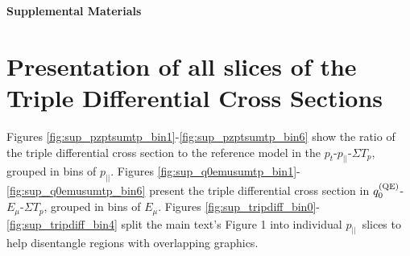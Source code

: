 \documentclass[aps,preprint,showpacs,superscriptaddress]{revtex4-2}  %
\newcommand{\pt}{\ensuremath{p_{t}}}
\newcommand{\pz}{\ensuremath{p_{||}}}
\newcommand{\sumtp}{\ensuremath{\Sigma T_{p}}}
\newcommand{\qzeroqe}{\ensuremath{q_{0}^{\rm\scriptstyle (QE)}}}
\begin{document}
\begin{center}
\textbf{\large Supplemental Materials}
\end{center}



\section{Presentation of all slices of the Triple Differential Cross Sections}
Figures \ref{fig:sup_pzptsumtp_bin1}-\ref{fig:sup_pzptsumtp_bin6} show the ratio of the triple differential cross section to the reference model in the \pt-\pz-\sumtp, grouped in bins of $\pz$.
Figures \ref{fig:sup_q0emusumtp_bin1}-\ref{fig:sup_q0emusumtp_bin6} present the triple differential cross section in $\qzeroqe$-$E_\mu$-\sumtp, grouped in bins of $E_\mu$. Figures \ref{fig:sup_tripdiff_bin0}-\ref{fig:sup_tripdiff_bin4} split the main text's Figure 1 into individual \pz~slices to help disentangle regions with overlapping graphics.
\end{document}
